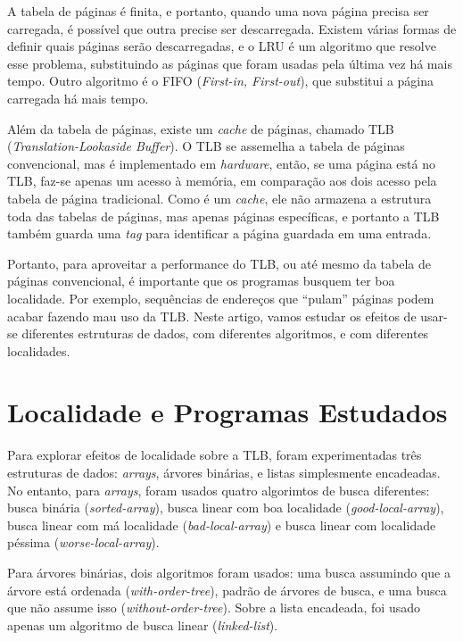 \documentclass[a4paper]{article}
\begin{document}
A tabela de páginas é finita, e portanto, quando uma nova página precisa ser
carregada, é possível que outra precise ser descarregada. Existem várias formas
de definir quais páginas serão descarregadas, e o LRU é um algoritmo que resolve
esse problema, substituindo as páginas que foram usadas pela última vez há mais
tempo. Outro algoritmo é o FIFO (\textit{First-in, First-out}), que substitui a
página carregada há mais tempo.

Além da tabela de páginas, existe um \textit{cache} de páginas, chamado TLB
(\textit{Translation-Lookaside Buffer}). O TLB se assemelha a tabela de
páginas convencional, mas é implementado em \textit{hardware}, então, se uma
página está no TLB, faz-se apenas um acesso à memória, em comparação aos
dois acesso pela tabela de página tradicional. Como é um \textit{cache}, ele não
armazena a estrutura toda das tabelas de páginas, mas apenas páginas
específicas, e portanto a TLB também guarda uma \textit{tag} para identificar a
página guardada em uma entrada.

Portanto, para aproveitar a performance do TLB, ou até mesmo da tabela de
páginas convencional, é importante que os programas busquem ter boa localidade.
Por exemplo, sequências de endereços que ``pulam'' páginas podem acabar fazendo
mau uso da TLB. Neste artigo, vamos estudar os efeitos de usar-se diferentes
estruturas de dados, com diferentes algoritmos, e com diferentes localidades.

\section{Localidade e Programas Estudados}

Para explorar efeitos de localidade sobre a TLB, foram experimentadas três
estruturas de dados: \textit{arrays}, árvores binárias, e listas simplesmente
encadeadas. No entanto, para \textit{arrays}, foram usados quatro algorimtos de
busca diferentes: busca binária (\textit{sorted-array}), busca linear com boa
localidade (\textit{good-local-array}), busca linear com má localidade
(\textit{bad-local-array}) e busca linear com localidade péssima
(\textit{worse-local-array}).

Para árvores binárias, dois algoritmos foram usados: uma busca assumindo que a
árvore está ordenada (\textit{with-order-tree}), padrão de árvores de busca, e
uma busca que não assume isso (\textit{without-order-tree}). Sobre a lista
encadeada, foi usado apenas um algoritmo de busca linear (\textit{linked-list}).
\end{document}
